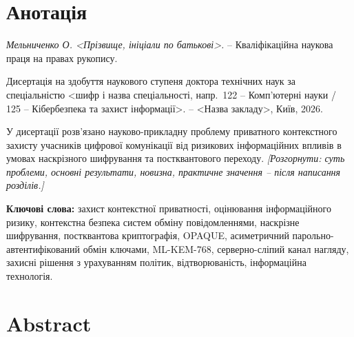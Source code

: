 
\chapter*{Анотація}

\noindent\textit{Мельниченко О. <Прізвище, ініціали по батькові>.} \thesistitle{} -- Кваліфікаційна наукова праця на правах рукопису.

\medskip

\noindent Дисертація на здобуття наукового ступеня доктора технічних наук за спеціальністю <шифр і назва спеціальності, напр.\ 122 -- Комп'ютерні науки / 125 -- Кібербезпека та захист інформації>. -- <Назва закладу>, Київ, 2026.

\bigskip

У дисертації розв'язано науково-прикладну проблему приватного контекстного захисту учасників цифрової комунікації від ризикових інформаційних впливів в умовах наскрізного шифрування та постквантового переходу. \emph{[Розгорнути: суть проблеми, основні результати, новизна, практичне значення -- після написання розділів.]}

\bigskip

\noindent\textbf{Ключові слова:} захист контекстної приватності, оцінювання інформаційного ризику, контекстна безпека систем обміну повідомленнями, наскрізне шифрування, постквантова криптографія, OPAQUE, асиметричний парольно-автентифікований обмін ключами, ML-KEM-768, серверно-сліпий канал нагляду, захисні рішення з урахуванням політик, відтворюваність, інформаційна технологія.


\chapter*{Abstract}

